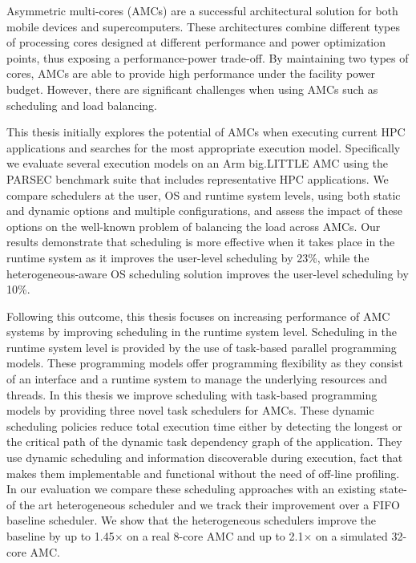 Asymmetric multi-cores (AMCs) are a successful architectural solution for both mobile devices and supercomputers. These architectures combine different types of processing cores designed at different performance and power optimization points, thus exposing a performance-power trade-off. By maintaining two types of cores, AMCs are able to provide high performance under the facility power budget. However, there are significant challenges when using AMCs such as scheduling and load balancing.

This thesis initially explores the potential of AMCs when executing current HPC applications and searches for the most appropriate execution model. Specifically we evaluate several execution models on an Arm big.LITTLE AMC using the PARSEC benchmark suite that includes representative HPC applications. We compare schedulers at the user, OS and runtime system levels, using both static and dynamic options and multiple configurations, and assess the impact of these options on the well-known problem of balancing the load across AMCs. Our results demonstrate that scheduling is more effective when it takes place in the runtime system as it improves the user-level scheduling by 23\%, while the heterogeneous-aware OS scheduling solution improves the user-level scheduling by 10\%.

Following this outcome, this thesis focuses on increasing performance of AMC systems by improving scheduling in the runtime system level. Scheduling in the runtime system level is provided by the use of task-based parallel programming models. These programming models offer programming flexibility as they consist of an interface and a runtime system to manage the underlying resources and threads. In this thesis we improve scheduling with task-based programming models by providing three novel task schedulers for AMCs. These dynamic scheduling policies reduce total execution time either by detecting the longest or the critical path of the dynamic task dependency graph of the application. They use dynamic scheduling and information discoverable during execution, fact that makes them implementable and functional without the need of off-line profiling. In our evaluation we compare these scheduling approaches with an existing state-of the art heterogeneous scheduler and we track their improvement over a FIFO baseline scheduler. We show that the heterogeneous schedulers improve the baseline by up to 1.45$\times$ on a real 8-core AMC and up to 2.1$\times$ on a simulated 32-core AMC.

